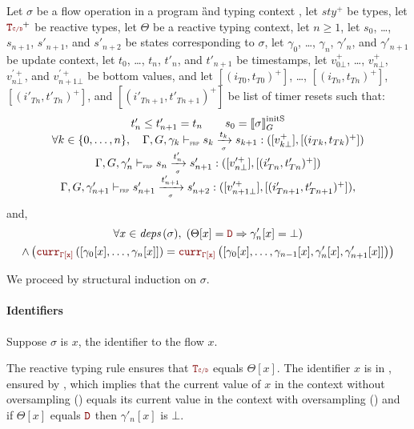 \begin{skippableproof}
    Let $\sigma$ be a flow operation in a program \G and typing context \tyCtx, let $sty^+$ be
    types, let $\rType^+$ be reactive types, let $\Theta$ be a reactive typing context, let $n\ge 1$,
    let $s_0$, \dots, $s_{n+1}$, $s'_{n+1}$, and $s'_{n+2}$ be states corresponding to $\sigma$, let
    $\gamma_0$, \dots, $\gamma_n$, $\gamma'_n$, and $\gamma'_{n+1}$ be update context, let $t_0$,
    \dots, $t_n$, $t'_n$, and $t'_{n+1}$ be timestamps, let $v_{0\bot}^+$, \dots, $v_{n\bot}^+$,
    $v_{n\bot}^{\prime+}$, and $v_{n+1\bot}^{\prime+}$ be bottom values, and let
    $[(i_{T0}, t_{T0})^+]$, \dots, $[(i_{Tn}, t_{Tn})^+]$, $[(i'_{Tn}, t'_{Tn})^+]$, and
    $[(i'_{Tn+1}, t'_{Tn+1})^+]$ be list of timer resets such that:
    \begin{equation*}
        \begin{array}{c}
            t'_n \le t'_{n+1} = t_n \qquad s_0 = \left\llbracket \sigma \right\rrbracket_G^\text{initS}                                                                \\
            \forall k \in \{0, \dots, n\}, \quad \Gamma, G, \gamma_k \vdash_{\textnormal{\tiny\textsc{frp}}} s_k \xrightarrow[\mbox{\tiny\ensuremath{\sigma}}]{t_k} s_{k+1}: ([v_{k\bot}^+], [(i_{Tk}, t_{Tk})^+]) \\
            \Gamma, G, \gamma'_n \vdash_{\textnormal{\tiny\textsc{frp}}} s_n \xrightarrow[\mbox{\tiny\ensuremath{\sigma}}]{t'_n} s'_{n+1}: ([v_{n\bot}^{\prime+}], [(i'_{Tn}, t'_{Tn})^+])                         \\
            \Gamma, G, \gamma'_{n+1} \vdash_{\textnormal{\tiny\textsc{frp}}} s'_{n+1} \xrightarrow[\mbox{\tiny\ensuremath{\sigma}}]{t'_{n+1}} s'_{n+2}: ([v_{n+1\bot}^{\prime+}], [(i'_{Tn+1}, t'_{Tn+1})^+]),
        \end{array}
    \end{equation*}
    and,
    \begin{multline*}
        \forall x \in \depSet{\sigma}, \; \left(\Theta[x] = \dType \Rightarrow \gamma'_n[x] = \bot\right) \\
        \wedge \left(\CurrVal{\tyCtx[x]}{[\gamma_0[x], \dots, \gamma_n[x]]} = \CurrVal{\tyCtx[x]}{[\gamma_0[x], \dots, \gamma_{n-1}[x], \gamma'_n[x], \gamma'_{n+1}[x]]}\right)
    \end{multline*}

    We proceed by structural induction on $\sigma$.

    \paragraph{Identifiers}
    Suppose $\sigma$ is $x$, the identifier to the flow $x$.

    The reactive typing rule  ensures that
    $\rType$ equals $\Theta[x]$. The identifier $x$ is in , ensured by
    , which implies that the current value
    of $x$ in the context without oversampling () equals
    its current value in the context with oversampling () and if $\Theta[x]$ equals $\dType$ then $\gamma'_n[x]$ is
    $\bot$.


\end{skippableproof}
